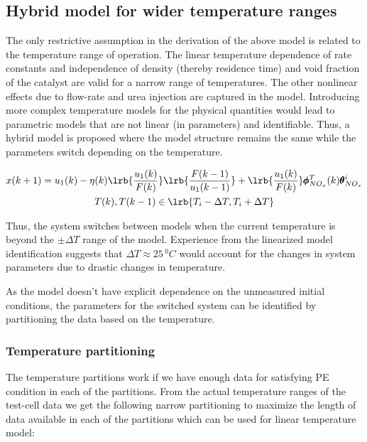 \subsection{Hybrid model for wider temperature ranges}

The only restrictive assumption in the derivation of the above model is related to the temperature range of operation.
The linear temperature dependence of rate constants and independence of density (thereby residence time) and void
fraction of the catalyst are valid for a narrow range of temperatures. The other nonlinear effects due to flow-rate and
urea injection are captured in the model. Introducing more complex temperature models for the physical quantities would
lead to parametric models that are not linear (in parameters) and identifiable. Thus, a hybrid model is proposed where
the model structure remains the same while the parameters switch depending on the temperature.

\begin{multline}
        x(k+1) = u_1(k) - \eta(k) \lrb{\frac{u_1(k)}{F(k)}} \lrb{\frac{F(k-1)}{u_1(k-1)}}
                        + \lrb{\frac{u_1(k)}{F(k)}} \pmb \phi^{T}_{NO_x}(k) \pmb \theta^i_{NO_x}
        \\
        T(k), T(k-1) \in \lrb{T_i-\Delta T, T_i + \Delta T}
\end{multline}

Thus, the system switches between models when the current temperature is beyond the $\pm \Delta T$ range of the model.
Experience from the linearized model identification suggests that $\Delta T \approx 25 \, ^0C$ would account for
the changes in system parameters due to drastic changes in temperature.

As the model doesn't have explicit dependence on the unmeasured initial conditions, the parameters for the switched system can be identified by partitioning the data based on the temperature.

\subsubsection{Temperature partitioning}

The temperature partitions work if we have enough data for satisfying PE condition in each of the partitions. From the actual temperature ranges of the test-cell data we get the following narrow partitioning to maximize the length of data available in each of the partitions which can be used for linear temperature model:

